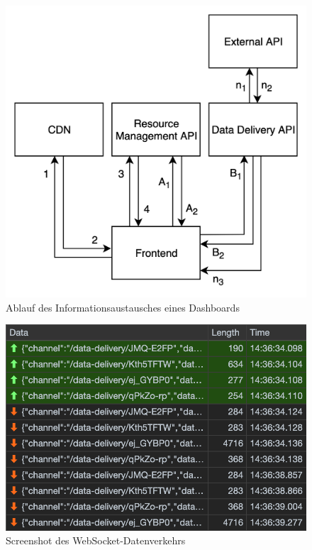 \begin{figure}
    \label{figure:informationsaustauschdashboard}
    \begin{center}
    \includegraphics[scale=0.2]{img/InformationsaustauschDashboard}
    \end{center}
    \caption{Ablauf des Informationsaustausches eines Dashboards}
\end{figure}

\begin{figure}
    \label{figure:screenshotdeswebsocketdatenverkehrs}
    \begin{center}
    \includegraphics[scale=0.65]{img/ScreenshotWebSocketTraffic}
    \end{center}
    \caption{Screenshot des WebSocket-Datenverkehrs}
\end{figure}

